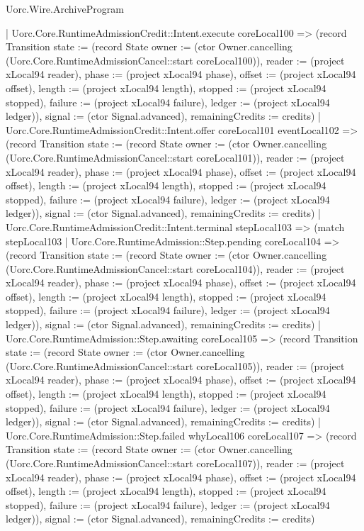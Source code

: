 \begin{lexlean}{Uorc.Wire.ArchiveProgram}
\begin{semanticmodule}
{      | Uorc.Core.RuntimeAdmissionCredit::Intent.execute coreLocal100 => (record Transition {state := (record State {owner := (ctor Owner.cancelling (Uorc.Core.RuntimeAdmissionCancel::start coreLocal100)), reader := (project xLocal94 reader), phase := (project xLocal94 phase), offset := (project xLocal94 offset), length := (project xLocal94 length), stopped := (project xLocal94 stopped), failure := (project xLocal94 failure), ledger := (project xLocal94 ledger)}), signal := (ctor Signal.advanced), remainingCredits := credits})
      | Uorc.Core.RuntimeAdmissionCredit::Intent.offer coreLocal101 eventLocal102 => (record Transition {state := (record State {owner := (ctor Owner.cancelling (Uorc.Core.RuntimeAdmissionCancel::start coreLocal101)), reader := (project xLocal94 reader), phase := (project xLocal94 phase), offset := (project xLocal94 offset), length := (project xLocal94 length), stopped := (project xLocal94 stopped), failure := (project xLocal94 failure), ledger := (project xLocal94 ledger)}), signal := (ctor Signal.advanced), remainingCredits := credits})
      | Uorc.Core.RuntimeAdmissionCredit::Intent.terminal stepLocal103 => (match stepLocal103
        | Uorc.Core.RuntimeAdmission::Step.pending coreLocal104 => (record Transition {state := (record State {owner := (ctor Owner.cancelling (Uorc.Core.RuntimeAdmissionCancel::start coreLocal104)), reader := (project xLocal94 reader), phase := (project xLocal94 phase), offset := (project xLocal94 offset), length := (project xLocal94 length), stopped := (project xLocal94 stopped), failure := (project xLocal94 failure), ledger := (project xLocal94 ledger)}), signal := (ctor Signal.advanced), remainingCredits := credits})
        | Uorc.Core.RuntimeAdmission::Step.awaiting coreLocal105 => (record Transition {state := (record State {owner := (ctor Owner.cancelling (Uorc.Core.RuntimeAdmissionCancel::start coreLocal105)), reader := (project xLocal94 reader), phase := (project xLocal94 phase), offset := (project xLocal94 offset), length := (project xLocal94 length), stopped := (project xLocal94 stopped), failure := (project xLocal94 failure), ledger := (project xLocal94 ledger)}), signal := (ctor Signal.advanced), remainingCredits := credits})
        | Uorc.Core.RuntimeAdmission::Step.failed whyLocal106 coreLocal107 => (record Transition {state := (record State {owner := (ctor Owner.cancelling (Uorc.Core.RuntimeAdmissionCancel::start coreLocal107)), reader := (project xLocal94 reader), phase := (project xLocal94 phase), offset := (project xLocal94 offset), length := (project xLocal94 length), stopped := (project xLocal94 stopped), failure := (project xLocal94 failure), ledger := (project xLocal94 ledger)}), signal := (ctor Signal.advanced), remainingCredits := credits})
}
\end{semanticmodule}
\end{lexlean}
